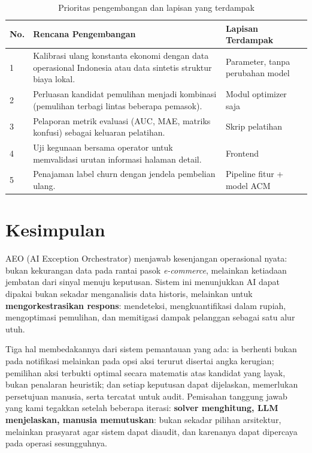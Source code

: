 \documentclass[12pt,a4paper]{article}
\begin{document}
\begin{table}[H]
  \centering\footnotesize
  \caption{Prioritas pengembangan dan lapisan yang terdampak}
  \label{tab:roadmap}
  \begin{tabularx}{\textwidth}{L{0.8cm} Y L{3.6cm}}
    \toprule
    \textbf{No.} & \textbf{Rencana Pengembangan} & \textbf{Lapisan Terdampak} \\
     & Kalibrasi ulang konstanta ekonomi dengan data operasional Indonesia atau data sintetis struktur biaya lokal. & Parameter, tanpa perubahan model \\[1.5pt]
    2 & Perluasan kandidat pemulihan menjadi kombinasi (pemulihan terbagi lintas beberapa pemasok). & Modul optimizer saja \\[1.5pt]
    3 & Pelaporan metrik evaluasi (AUC, MAE, matriks konfusi) sebagai keluaran pelatihan. & Skrip pelatihan \\[1.5pt]
    4 & Uji kegunaan bersama operator untuk memvalidasi urutan informasi halaman detail. & Frontend \\[1.5pt]
    5 & Penajaman label churn dengan jendela pembelian ulang. & Pipeline fitur + model ACM \\
    \bottomrule
  \end{tabularx}
\end{table}

\section{Kesimpulan}

AEO (AI Exception Orchestrator) menjawab kesenjangan operasional nyata: bukan kekurangan data pada rantai pasok \textit{e-commerce}, melainkan ketiadaan jembatan dari sinyal menuju keputusan. Sistem ini menunjukkan AI dapat dipakai bukan sekadar menganalisis data historis, melainkan untuk \textbf{mengorkestrasikan respons}: mendeteksi, mengkuantifikasi dalam rupiah, mengoptimasi pemulihan, dan memitigasi dampak pelanggan sebagai satu alur utuh.

Tiga hal membedakannya dari sistem pemantauan yang ada: ia berhenti bukan pada notifikasi melainkan pada opsi aksi terurut disertai angka kerugian; pemilihan aksi terbukti optimal secara matematis atas kandidat yang layak, bukan penalaran heuristik; dan setiap keputusan dapat dijelaskan, memerlukan persetujuan manusia, serta tercatat untuk audit. Pemisahan tanggung jawab yang kami tegakkan setelah beberapa iterasi: \textbf{solver menghitung, LLM menjelaskan, manusia memutuskan}: bukan sekadar pilihan arsitektur, melainkan prasyarat agar sistem dapat diaudit, dan karenanya dapat dipercaya pada operasi sesungguhnya.
\end{document}
